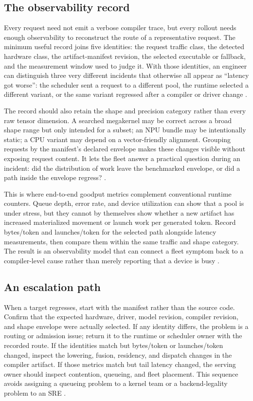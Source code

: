 \subsection{The observability record}

Every request need not emit a verbose compiler trace, but every rollout needs enough observability to reconstruct the route of a representative request. The minimum useful record joins five identities: the request traffic class, the detected hardware class, the artifact-manifest revision, the selected executable or fallback, and the measurement window used to judge it. With those identities, an engineer can distinguish three very different incidents that otherwise all appear as ``latency got worse'': the scheduler sent a request to a different pool, the runtime selected a different variant, or the same variant regressed after a compiler or driver change \citep{iree2024,patel2025llminference}.

The record should also retain the shape and precision category rather than every raw tensor dimension. A searched megakernel may be correct across a broad shape range but only intended for a subset; an NPU bundle may be intentionally static; a CPU variant may depend on a vector-friendly alignment. Grouping requests by the manifest's declared envelope makes these changes visible without exposing request content. It lets the fleet answer a practical question during an incident: did the distribution of work leave the benchmarked envelope, or did a path inside the envelope regress? \citep{memoryfloor2026,iree2024}.

This is where end-to-end goodput metrics complement conventional runtime counters. Queue depth, error rate, and device utilization can show that a pool is under stress, but they cannot by themselves show whether a new artifact has increased materialized movement or launch work per generated token. Record bytes/token and launches/token for the selected path alongside latency measurements, then compare them within the same traffic and shape category. The result is an observability model that can connect a fleet symptom back to a compiler-level cause rather than merely reporting that a device is busy \citep{memoryfloor2026,taxbreak2026}.

\subsection{An escalation path}

When a target regresses, start with the manifest rather than the source code. Confirm that the expected hardware, driver, model revision, compiler revision, and shape envelope were actually selected. If any identity differs, the problem is a routing or admission issue; return it to the runtime or scheduler owner with the recorded route. If the identities match but bytes/token or launches/token changed, inspect the lowering, fusion, residency, and dispatch changes in the compiler artifact. If those metrics match but tail latency changed, the serving owner should inspect contention, queueing, and fleet placement. This sequence avoids assigning a queueing problem to a kernel team or a backend-legality problem to an SRE \citep{taxbreak2026,memoryfloor2026,yirage2026}.

